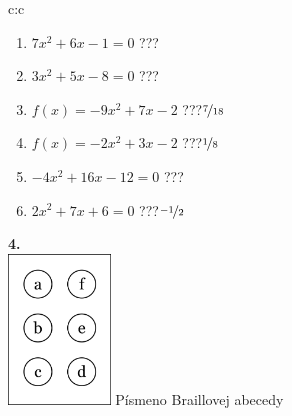 \documentclass[10pt]{report}
\begin{document}
\begin{tabular}{c:c}
\begin{minipage}[c][104.5mm][t]{0.5\linewidth}
\begin{center}
\begin{minipage}{0.79\linewidth}
\begin{center}
\begin{varwidth}{\linewidth}
\begin{enumerate}
\Large
\item $7x^2+6x-1=0$\quad \dotfill\; ???\;\dotfill {}
\item $3x^2+5x-8=0$\quad \dotfill\; ???\;\dotfill {}
\item $f(x)=-9x^2+7x-2$\quad \dotfill\; ???\;\dotfill \quad $\nicefrac{7}{18}$
\item $f(x)=-2x^2+3x-2$\quad \dotfill\; ???\;\dotfill \quad $\nicefrac{1}{8}$
\item $-4x^2+16x-12=0$\quad \dotfill\; ???\;\dotfill {}
\item $2x^2+7x+6=0$\quad \dotfill\; ???\;\dotfill \quad $\nicefrac{-1}{2}$
\end{enumerate}
\end{varwidth}
\end{center}
\end{minipage}
\begin{minipage}{0.20\linewidth}
\begin{center}
{\Huge\bfseries 4.} \\[2mm]
\includegraphics[height=40mm]{../images/braille.png}
{\small Písmeno Braillovej abecedy}
\end{center}
\end{minipage}
\end{center}
\end{minipage}
%
\end{tabular}
\newpage
\thispagestyle{empty}
\end{document}
